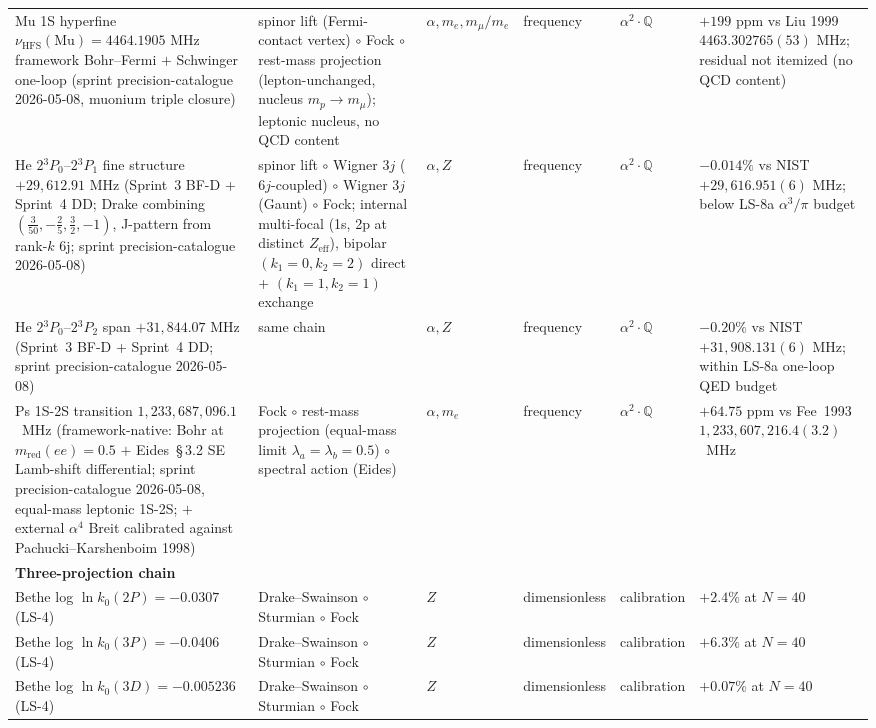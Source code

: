 \documentclass[11pt]{article}
\begin{document}
\begin{longtable}{p{3.5cm} p{2.8cm} p{1.3cm} p{2.2cm} p{1.8cm} p{1.4cm}}
Mu 1S hyperfine $\nu_\text{HFS}(\text{Mu}) = 4464.1905$ MHz framework
Bohr--Fermi $+$ Schwinger one-loop (sprint precision-catalogue 2026-05-08,
muonium triple closure) & spinor lift (Fermi-contact vertex) $\circ$ Fock
$\circ$ rest-mass projection (lepton-unchanged, nucleus $m_p \to m_\mu$);
leptonic nucleus, no QCD content & $\alpha, m_e, m_\mu/m_e$ & frequency &
$\alpha^2{\cdot}\mathbb{Q}$ & $+199$ ppm vs Liu 1999 $4463.302765(53)$ MHz;
residual not itemized (no QCD content) \\
He $2{}^3P_0$--$2{}^3P_1$ fine structure $+29{,}612.91$ MHz (Sprint~3
BF-D + Sprint~4 DD; Drake combining $(\tfrac{3}{50},-\tfrac{2}{5},
\tfrac{3}{2},-1)$, J-pattern from rank-$k$ 6j; sprint precision-catalogue
2026-05-08) & spinor lift $\circ$ Wigner $3j$ ($6j$-coupled) $\circ$
Wigner $3j$ (Gaunt) $\circ$ Fock; internal multi-focal (1s, 2p at
distinct $Z_\text{eff}$), bipolar $(k_1{=}0,k_2{=}2)$ direct +
$(k_1{=}1,k_2{=}1)$ exchange & $\alpha, Z$ & frequency &
$\alpha^2{\cdot}\mathbb{Q}$ & $-0.014\%$ vs NIST $+29{,}616.951(6)$ MHz;
below LS-8a $\alpha^3/\pi$ budget \\
He $2{}^3P_0$--$2{}^3P_2$ span $+31{,}844.07$ MHz (Sprint~3 BF-D
+ Sprint~4 DD; sprint precision-catalogue 2026-05-08) & same chain &
$\alpha, Z$ & frequency & $\alpha^2{\cdot}\mathbb{Q}$ &
$-0.20\%$ vs NIST $+31{,}908.131(6)$ MHz; within LS-8a one-loop QED budget \\
Ps 1S-2S transition $1{,}233{,}687{,}096.1$~MHz (framework-native: Bohr at
$m_\text{red}(ee) = 0.5$ $+$ Eides~\S\,3.2 SE Lamb-shift differential;
sprint precision-catalogue 2026-05-08, equal-mass leptonic 1S-2S; $+$
external $\alpha^4$ Breit calibrated against Pachucki--Karshenboim 1998) & Fock $\circ$ rest-mass
projection (equal-mass limit $\lambda_a = \lambda_b = 0.5$) $\circ$
spectral action (Eides) & $\alpha, m_e$ & frequency &
$\alpha^2{\cdot}\mathbb{Q}$ & $+64.75$ ppm vs Fee~1993
$1{,}233{,}607{,}216.4(3.2)$~MHz \\
\midrule
\textbf{Three-projection chain} & & & & & \\
Bethe log $\ln k_0(2P) = -0.0307$ (LS-4) & Drake--Swainson $\circ$ Sturmian
$\circ$ Fock & $Z$ & dimensionless & calibration & $+2.4\%$ at $N=40$ \\
Bethe log $\ln k_0(3P) = -0.0406$ (LS-4) & Drake--Swainson $\circ$ Sturmian
$\circ$ Fock & $Z$ & dimensionless & calibration & $+6.3\%$ at $N=40$ \\
Bethe log $\ln k_0(3D) = -0.005236$ (LS-4) & Drake--Swainson $\circ$ Sturmian
$\circ$ Fock & $Z$ & dimensionless & calibration & $+0.07\%$ at $N=40$ \\

\end{longtable}
\end{document}
